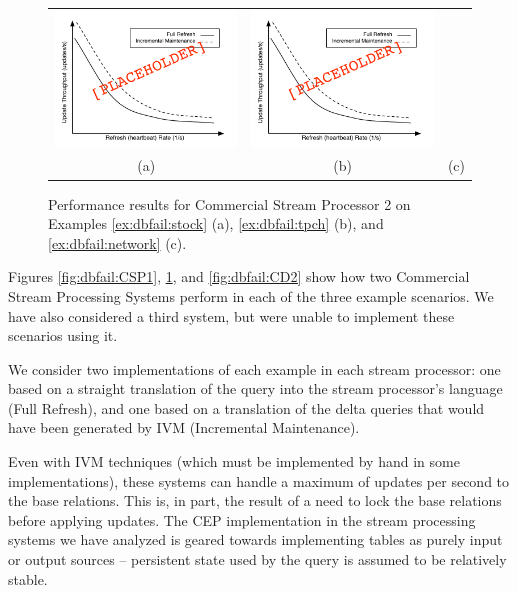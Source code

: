 \begin{figure}
\begin{center}
\begin{tabular}{ccc}
\includegraphics[width=2in]{../graphics-tmp/placeholder_stream_result} &
\includegraphics[width=2in]{../graphics-tmp/placeholder_stream_result} \\
(a) & (b) & (c)
\end{tabular}
\end{center}
\label{fig:dbfail:CSP2}
\caption{Performance results for Commercial Stream Processor 2 on Examples \ref{ex:dbfail:stock} (a), \ref{ex:dbfail:tpch} (b), and \ref{ex:dbfail:network} (c).}
\end{figure}

Figures \ref{fig:dbfail:CSP1}, \ref{fig:dbfail:CSP2}, and \ref{fig:dbfail:CD2} show how two Commercial Stream Processing Systems perform in each of the three example scenarios.  We have also considered a third system, but were unable to implement these scenarios using it.

We consider two implementations of each example in each stream processor: one based on a straight translation of the query into the stream processor's language (Full Refresh), and one based on a translation of the delta queries that would have been generated by IVM (Incremental Maintenance).

Even with IVM techniques (which must be implemented by hand in some implementations), these systems can handle a maximum of  updates per second to the base relations.  This is, in part, the result of a need to lock the base relations before applying updates.  The CEP implementation in the stream processing systems we have analyzed is geared towards implementing tables as purely input or output sources -- persistent state used by the query is assumed to be relatively stable.  

